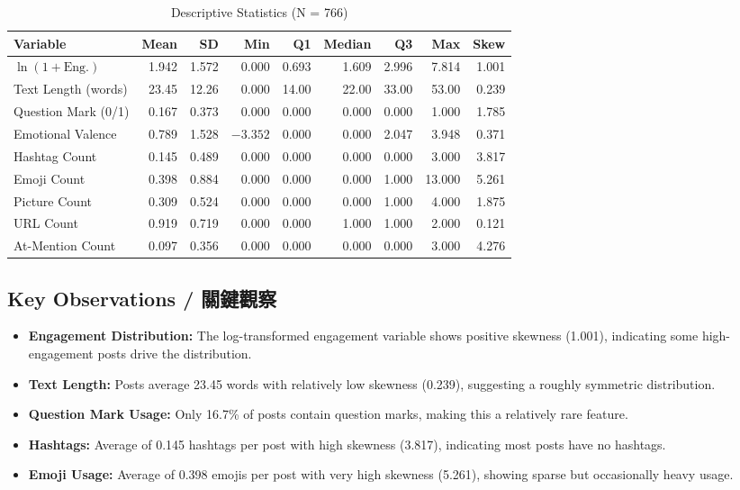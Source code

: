 \documentclass[12pt,a4paper,fontset=none]{ctexart}
\begin{document}
\begin{table}[H]
\centering
\caption{Descriptive Statistics (N = 766)}
\label{tab:desc_full}
\small
\begin{tabular}{lrrrrrrrr}
\toprule
Variable & Mean & SD & Min & Q1 & Median & Q3 & Max & Skew \\
\midrule
$\ln(1+\text{Eng.})$ & 1.942 & 1.572 & 0.000 & 0.693 & 1.609 & 2.996 & 7.814 & 1.001 \\
Text Length (words) & 23.45 & 12.26 & 0.000 & 14.00 & 22.00 & 33.00 & 53.00 & 0.239 \\
Question Mark (0/1) & 0.167 & 0.373 & 0.000 & 0.000 & 0.000 & 0.000 & 1.000 & 1.785 \\
Emotional Valence & 0.789 & 1.528 & $-3.352$ & 0.000 & 0.000 & 2.047 & 3.948 & 0.371 \\
Hashtag Count & 0.145 & 0.489 & 0.000 & 0.000 & 0.000 & 0.000 & 3.000 & 3.817 \\
Emoji Count & 0.398 & 0.884 & 0.000 & 0.000 & 0.000 & 1.000 & 13.000 & 5.261 \\
Picture Count & 0.309 & 0.524 & 0.000 & 0.000 & 0.000 & 1.000 & 4.000 & 1.875 \\
URL Count & 0.919 & 0.719 & 0.000 & 0.000 & 1.000 & 1.000 & 2.000 & 0.121 \\
At-Mention Count & 0.097 & 0.356 & 0.000 & 0.000 & 0.000 & 0.000 & 3.000 & 4.276 \\
\bottomrule
\end{tabular}
\end{table}

\subsection{Key Observations / 關鍵觀察}

\begin{itemize}
    \item \textbf{Engagement Distribution:} The log-transformed engagement variable shows positive skewness (1.001), indicating some high-engagement posts drive the distribution.
    \item \textbf{Text Length:} Posts average 23.45 words with relatively low skewness (0.239), suggesting a roughly symmetric distribution.
    \item \textbf{Question Mark Usage:} Only 16.7\% of posts contain question marks, making this a relatively rare feature.
    \item \textbf{Hashtags:} Average of 0.145 hashtags per post with high skewness (3.817), indicating most posts have no hashtags.
    \item \textbf{Emoji Usage:} Average of 0.398 emojis per post with very high skewness (5.261), showing sparse but occasionally heavy usage.
\end{itemize}
\end{document}
